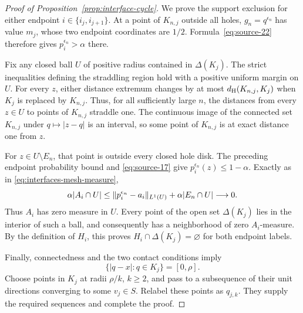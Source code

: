\begin{proof}[Proof of Proposition~\ref{prop:interface-cycle}]
We prove the support exclusion for either endpoint
$i\in\{i_j,i_{j+1}\}$.  At a point of $K_{n,j}$ outside all holes,
$g_n=q^{\epsilon_n}$ has value $m_j$, whose two endpoint
coordinates are $1/2$.  Formula~\eqref{eq:source-22} therefore gives
$p_i^{\epsilon_n}>\alpha$ there.

Fix any closed ball $U$ of positive radius contained in
$\Delta(K_j)$.  The strict inequalities defining the straddling
region hold with a positive uniform margin on $U$.  For every
$z$, either distance extremum changes by at most
$d_{\rm H}(K_{n,j},K_j)$ when $K_j$ is replaced by $K_{n,j}$.
Thus, for all sufficiently large $n$, the distances from every
$z\in U$ to points of $K_{n,j}$ straddle one.  The continuous
image of the connected set $K_{n,j}$ under $q\mapsto|z-q|$
is an interval, so some point of $K_{n,j}$ is at exact distance
one from $z$.

For $z\in U\setminus E_n$, that point is outside every closed hole
disk.  The preceding endpoint probability bound and
\eqref{eq:source-17} give $p_i^{\epsilon_n}(z)\le1-\alpha$.
Exactly as in \eqref{eq:interfaces-mesh-measure},
\[
 \alpha |A_i\cap U|
 \le \lVert p_i^{\epsilon_n}-a_i\rVert_{L^1(U)}
       +\alpha |E_n\cap U|\longrightarrow0.
\]
Thus $A_i$ has zero measure in $U$.  Every point of the open set
$\Delta(K_j)$ lies in the interior of such a ball, and consequently
has a neighborhood of zero $A_i$-measure.  By the definition of
$H_i$, this proves $H_i\cap\Delta(K_j)=\varnothing$ for both
endpoint labels.

Finally, connectedness and the two contact conditions imply
\[
 \{|q-x|:q\in K_j\}=[0,\rho].
\]
Choose points in $K_j$ at radii $\rho/k$, $k\ge2$, and pass to a
subsequence of their unit directions converging to some $v_j\in S$.
Relabel these points as $q_{j,k}$.  They supply the required
sequences and complete the proof.
\end{proof}
